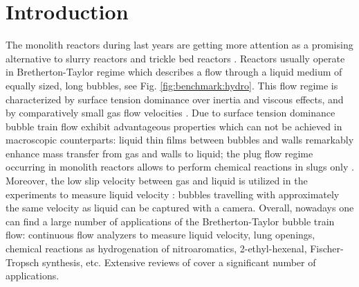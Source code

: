 \documentclass{article}
\begin{document}
\section{Introduction}
\label{intro}
The monolith reactors during last years are getting more attention as a promising alternative to slurry
reactors and trickle bed reactors \cite{kreutzer-overview,bercic-mass}. Reactors usually operate in Bretherton-Taylor regime \cite{bretherton,taylor} which describes a flow through
a liquid medium of equally sized, long bubbles, see
Fig. \ref{fig:benchmark:hydro}. This flow regime
is characterized by surface tension dominance over inertia and viscous effects, and by
comparatively small gas flow velocities \cite{yue-mass}. Due to surface tension dominance bubble train flow exhibit advantageous properties which can not be achieved
in macroscopic counterparts: liquid thin films \cite{bretherton} between bubbles and walls remarkably enhance mass
transfer from gas and walls to liquid; the plug flow regime occurring in monolith reactors allows to perform chemical reactions in slugs only \cite{kreutzer-overview}. Moreover, the low slip velocity between gas and liquid is utilized in the experiments to measure liquid velocity \cite{taylor}:  bubbles travelling with approximately the same velocity as liquid can be captured with a camera. Overall, nowadays one can find a large number of applications
of the Bretherton-Taylor bubble train flow: continuous flow analyzers to measure liquid velocity, lung openings, chemical reactions
as hydrogenation of nitroaromatics, 2-ethyl-hexenal, Fischer-Tropsch synthesis, etc. Extensive reviews of \citet{kreutzer-overview,
gupta-review,yue-mass} cover a significant number of applications. 
\end{document}
